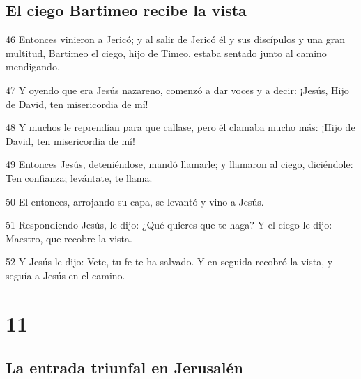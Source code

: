 \section*{El ciego Bartimeo recibe la vista}

\par 46 Entonces vinieron a Jericó; y al salir de Jericó él y sus discípulos y una gran multitud, Bartimeo el ciego, hijo de Timeo, estaba sentado junto al camino mendigando.
\par 47 Y oyendo que era Jesús nazareno, comenzó a dar voces y a decir: ¡Jesús, Hijo de David, ten misericordia de mí!
\par 48 Y muchos le reprendían para que callase, pero él clamaba mucho más: ¡Hijo de David, ten misericordia de mí!
\par 49 Entonces Jesús, deteniéndose, mandó llamarle; y llamaron al ciego, diciéndole: Ten confianza; levántate, te llama.
\par 50 El entonces, arrojando su capa, se levantó y vino a Jesús.
\par 51 Respondiendo Jesús, le dijo: ¿Qué quieres que te haga? Y el ciego le dijo: Maestro, que recobre la vista.
\par 52 Y Jesús le dijo: Vete, tu fe te ha salvado. Y en seguida recobró la vista, y seguía a Jesús en el camino.

\chapter{11}

\section*{La entrada triunfal en Jerusalén}

